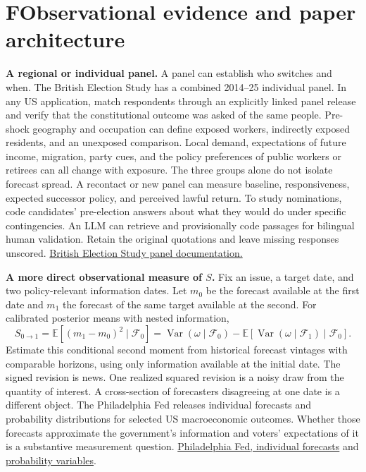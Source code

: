 \documentclass[11pt,letterpaper]{article}
\newcommand{\sect}[1]{\section*{\color{ink}#1}}
\newcommand{\lead}[1]{\textbf{#1}\enspace}
\newcommand{\E}{\mathbb E}
\newcommand{\Var}{\operatorname{Var}}
\newcommand{\src}[2]{\href{#1}{#2}}
\begin{document}
\newpage
\sect{F\quad Observational evidence and paper architecture}
\lead{A regional or individual panel.} A panel can establish who switches and when. The British Election Study has a combined 2014--25 individual panel. In any US application, match respondents through an explicitly linked panel release and verify that the constitutional outcome was asked of the same people. Pre-shock geography and occupation can define exposed workers, indirectly exposed residents, and an unexposed comparison. Local demand, expectations of future income, migration, party cues, and the policy preferences of public workers or retirees can all change with exposure. The three groups alone do not isolate forecast spread. A recontact or new panel can measure baseline, responsiveness, expected successor policy, and perceived lawful return. To study nominations, code candidates' pre-election answers about what they would do under specific contingencies. An LLM can retrieve and provisionally code passages for bilingual human validation. Retain the original quotations and leave missing responses unscored. \src{https://pure.royalholloway.ac.uk/en/datasets/british-election-study-2014-25-combined-wave-1-30-internet-panel/}{British Election Study panel documentation.}

\lead{A more direct observational measure of $S$.} Fix an issue, a target date, and two policy-relevant information dates. Let $m_0$ be the forecast available at the first date and $m_1$ the forecast of the same target available at the second. For calibrated posterior means with nested information,
\[
 S_{0\to1}=\E[(m_1-m_0)^2\mid\mathcal F_0]
 =\Var(\omega\mid\mathcal F_0)-\E[\Var(\omega\mid\mathcal F_1)\mid\mathcal F_0].
\]
Estimate this conditional second moment from historical forecast vintages with comparable horizons, using only information available at the initial date. The signed revision is news. One realized squared revision is a noisy draw from the quantity of interest. A cross-section of forecasters disagreeing at one date is a different object. The Philadelphia Fed releases individual forecasts and probability distributions for selected US macroeconomic outcomes. Whether those forecasts approximate the government's information and voters' expectations of it is a substantive measurement question. \src{https://www.philadelphiafed.org/surveys-and-data/real-time-data-research/individual-forecasts}{Philadelphia Fed, individual forecasts} and \src{https://www.philadelphiafed.org/surveys-and-data/real-time-data-research/probability-variables}{probability variables}.
\end{document}
